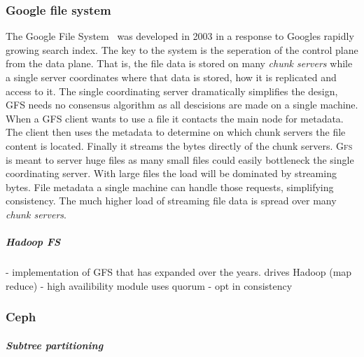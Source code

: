\subsubsection*{Google file system}
The Google File System~\cite{GFS} was developed in 2003 in a response to Googles rapidly growing search index. The key to the system is the seperation of the control plane from the data plane. That is, the file data is stored on many \textit{chunk servers} while a single server coordinates where that data is stored, how it is replicated and access to it. The single coordinating server dramatically simplifies the design, \textsc{GFS} needs no consensus algorithm as all descisions are made on a single machine.
%
When a \textsc{GFS} client wants to use a file it contacts the main node for metadata. The client then uses the metadata to determine on which chunk servers the file content is located. Finally it streams the bytes directly of the chunk servers. \textsc{Gfs} is meant to server huge files as many small files could easily bottleneck the single coordinating server.
%
With large files the load will be dominated by streaming bytes. File metadata a single machine can handle those requests, simplifying consistency. The much higher load of streaming file data is spread over many \textit{chunk servers}.


\subparagraph*{Hadoop FS}
- implementation of GFS that has expanded over the years. drives Hadoop (map reduce) 
- high availibility module uses quorum
- opt in consistency

\subsubsection*{Ceph}

\subparagraph{Subtree partitioning}
